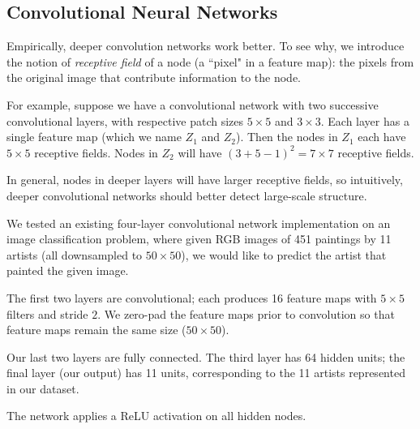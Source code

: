 \documentclass{article}
\begin{document}
\begin{multicols}{2}
\section{Convolutional Neural Networks}


Empirically, deeper convolution networks work better.
To see why, we introduce the notion of \emph{receptive field}
of a node (a ``pixel" in a feature map):
the pixels from the original image that contribute information
to the node.

For example,
suppose we have a convolutional network
with two successive convolutional layers,
with respective patch sizes $5\times 5$ and $3\times 3$.
Each layer has a single feature map (which we name $Z_1$ and $Z_2$).
Then the nodes in $Z_1$ each have $5\times 5$ receptive fields.
Nodes in $Z_2$ will have $(3 + 5 - 1)^2 = 7\times 7$ receptive fields.

In general,
nodes in deeper layers will have larger receptive fields,
so intuitively,
deeper convolutional networks should better detect large-scale structure.

We tested an existing four-layer convolutional network implementation
on an image classification problem,
where given RGB images of 451 paintings by 11 artists
(all downsampled to $50\times 50$),
we would like to predict the artist that painted the given image.

The first two layers are convolutional;
each produces 16 feature maps
with $5\times 5$ filters and stride $2$.
We zero-pad the feature maps prior to convolution
so that feature maps remain the same size ($50\times 50$).

Our last two layers are fully connected.
The third layer has 64 hidden units;
the final layer (our output) has 11 units,
corresponding to the 11 artists represented in our dataset.

The network applies a ReLU activation on all hidden nodes.


\end{multicols}
\end{document}
